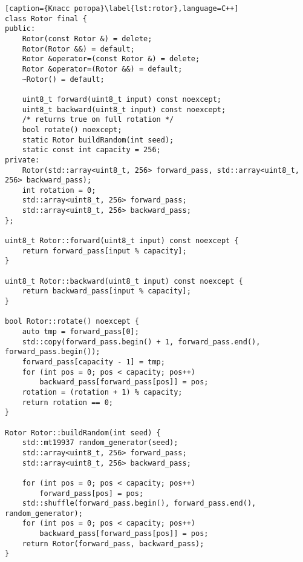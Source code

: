 \begin{lstlisting}[caption={Класс ротора}\label{lst:rotor},language=C++]
class Rotor final {
public:
    Rotor(const Rotor &) = delete;
    Rotor(Rotor &&) = default;
    Rotor &operator=(const Rotor &) = delete;
    Rotor &operator=(Rotor &&) = default;
    ~Rotor() = default;

    uint8_t forward(uint8_t input) const noexcept;
    uint8_t backward(uint8_t input) const noexcept;
    /* returns true on full rotation */
    bool rotate() noexcept;
    static Rotor buildRandom(int seed);
    static const int capacity = 256;
private:
    Rotor(std::array<uint8_t, 256> forward_pass, std::array<uint8_t, 256> backward_pass);
    int rotation = 0;
    std::array<uint8_t, 256> forward_pass;
    std::array<uint8_t, 256> backward_pass;
};

uint8_t Rotor::forward(uint8_t input) const noexcept {
    return forward_pass[input % capacity];
}

uint8_t Rotor::backward(uint8_t input) const noexcept {
    return backward_pass[input % capacity];
}

bool Rotor::rotate() noexcept {
    auto tmp = forward_pass[0];
    std::copy(forward_pass.begin() + 1, forward_pass.end(), forward_pass.begin());
    forward_pass[capacity - 1] = tmp;
    for (int pos = 0; pos < capacity; pos++)
        backward_pass[forward_pass[pos]] = pos;
    rotation = (rotation + 1) % capacity;
    return rotation == 0;
}

Rotor Rotor::buildRandom(int seed) {
    std::mt19937 random_generator(seed);
    std::array<uint8_t, 256> forward_pass;
    std::array<uint8_t, 256> backward_pass;

    for (int pos = 0; pos < capacity; pos++)
        forward_pass[pos] = pos;
    std::shuffle(forward_pass.begin(), forward_pass.end(), random_generator);
    for (int pos = 0; pos < capacity; pos++)
        backward_pass[forward_pass[pos]] = pos;
    return Rotor(forward_pass, backward_pass);
}
\end{lstlisting}

